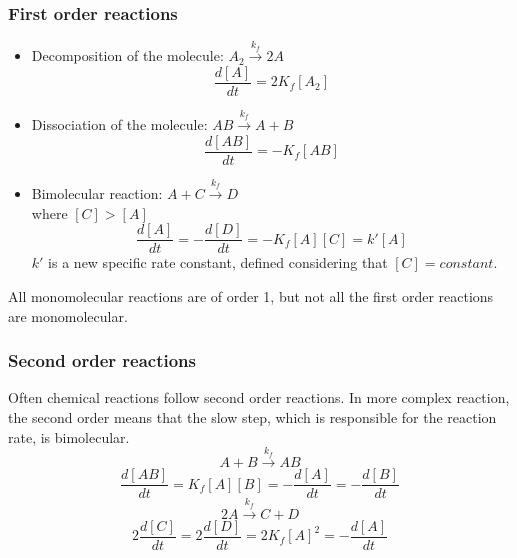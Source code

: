 \documentclass[12pt]{article}
\begin{document}
\subsubsection{First order reactions}

\begin{itemize}
    \item Decomposition of the molecule: $A_{2}\xrightarrow{k_{f}} 2A$
    \begin{equation}
        \frac{d[A]}{dt}=2K_{f}[A_{2}]
    \end{equation}
    \item Dissociation of the molecule:
    $AB\xrightarrow{k_{f}} A+B$
    \begin{equation}
        \frac{d[AB]}{dt}=-K_{f}[AB]
    \end{equation}
    \item Bimolecular reaction:
    $A+C\xrightarrow{k_{f}} D$ \\where $[C]>[A]$
    \begin{equation}
        \frac{d[A]}{dt}=-\frac{d[D]}{dt}=-K_{f}[A][C]=k'[A]
    \end{equation}
    $k'$ is a new specific rate constant, defined considering that $[C]=constant$.
\end{itemize}
All monomolecular reactions are of order 1, but not all the first order reactions are monomolecular.

\subsubsection{Second order reactions}

Often chemical reactions follow second order reactions. In more complex reaction, the second order means that the slow step, which is responsible for the reaction rate, is bimolecular.
\begin{equation}
 A+B\xrightarrow{k_{f}} AB   
\end{equation}
    \begin{equation}
        \frac{d[AB]}{dt}=K_{f}[A][B]=-\frac{d[A]}{dt}=-\frac{d[B]}{dt}
    \end{equation}
\begin{equation}
   2A\xrightarrow{k_{f}} C+D 
\end{equation}
    \begin{equation}
        2\frac{d[C]}{dt}=2\frac{d[D]}{dt}=2K_{f}[A]^{2}=-\frac{d[A]}{dt}
    \end{equation}
\end{document}
